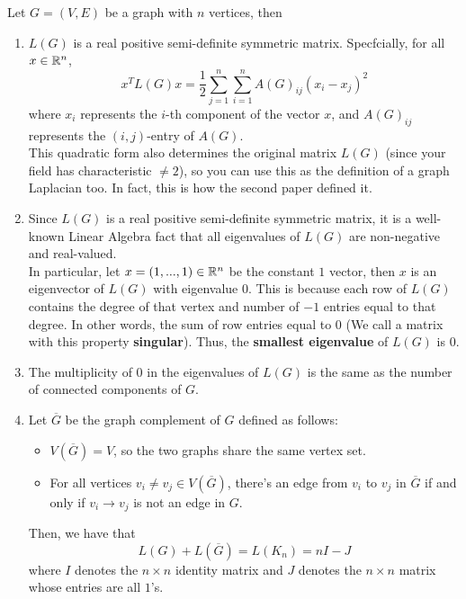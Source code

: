 \documentclass{article}
\begin{document}
\begin{proposition}\label{thm::laplacian}
    Let $G = (V, E)$ be a graph with $n$ vertices, then
    \begin{enumerate}
        \item $L(G)$ is a real positive semi-definite symmetric matrix. Specfcially, for all $x \in \mathbb{R}^n$,
        \[x^T L(G) x = \frac{1}{2} \sum_{j=1}^n \sum_{i=1}^n A(G)_{ij} (x_i - x_j)^2\]
        where $x_i$ represents the $i$-th component of the vector $x$, and $A(G)_{ij}$ represents the $(i, j)$-entry of $A(G)$.\\

        This quadratic form also determines the original matrix $L(G)$ (since your field has characteristic $\neq 2$), so you can use this as the definition of a graph Laplacian too. In fact, this is how the second paper \cite{MiroslavFiedler1989} defined it.
        \item Since $L(G)$ is a real positive semi-definite symmetric matrix, it is a well-known Linear Algebra fact that all eigenvalues of $L(G)$ are non-negative and real-valued.\\
        
        In particular, let $x = (1, ..., 1) \in \mathbb{R}^n$ be the constant $1$ vector, then $x$ is an eigenvector of $L(G)$ with eigenvalue $0$. This is because each row of $L(G)$ contains the degree of that vertex and number of $-1$ entries equal to that degree. In other words, the sum of row entries equal to $0$ (We call a matrix with this property \textbf{singular}). Thus, the \textbf{smallest eigenvalue} of $L(G)$ is $0$.
        \item The multiplicity of $0$ in the eigenvalues of $L(G)$ is the same as the number of connected components of $G$.
        \item Let $\overline{G}$ be the graph complement of $G$ defined as follows:
        \begin{itemize}
            \item $V(\overline{G}) = V$, so the two graphs share the same vertex set.
            \item For all vertices $v_i \neq v_j \in V(\overline{G})$, there's an edge from $v_i$ to $v_j$ in $\overline{G}$ if and only if $v_i \to v_j$ is not an edge in $G$.
        \end{itemize}
        Then, we have that
        \[L(G) + L(\overline{G}) = L(K_n) = nI - J\]
        where $I$ denotes the $n \times n$ identity matrix and $J$ denotes the $n \times n$ matrix whose entries are all $1$'s.
    \end{enumerate}
\end{proposition}
\end{document}
